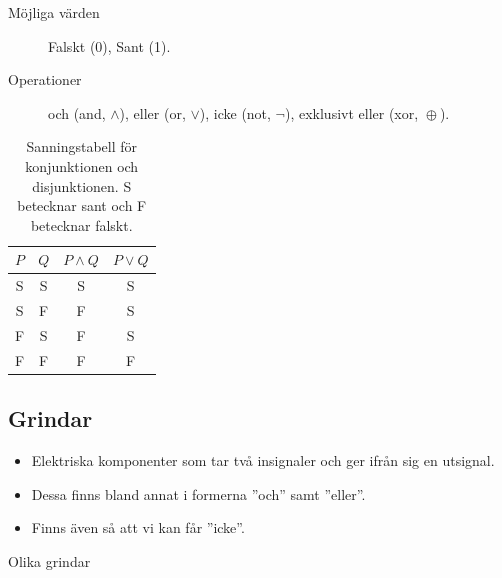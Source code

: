 \documentclass{beamer}
\DeclareMathOperator{\xor}{\oplus}
\theoremstyle{definition}
\theoremstyle{remark}
\begin{document}
\begin{frame}{\insertsubsectionhead}
  \begin{description}
    \item[Möjliga värden] Falskt (0), Sant (1).
    \item[Operationer] och (and, \(\land\)),
      eller (or, \(\lor\)),
      icke (not, \(\lnot\)),
      exklusivt eller (xor, \(\xor\)).
  \end{description}
\end{frame}

\begin{frame}{\insertsubsectionhead}
  \begin{table}
    \caption{Sanningstabell för konjunktionen och disjunktionen. S betecknar 
      sant
      och F betecknar falskt.}
    \begin{tabular}{c|c|c|c}
      \toprule
      \(P\)    & \(Q\)      & \(P\land Q\)  & \(P\lor Q\) \\
      \midrule
      S      &  S      & S       & S \\
      S      &  F      & F        & S \\
      F      &  S      & F        & S \\
      F      &  F      & F        & F \\
      \bottomrule
    \end{tabular}
    \label{tbl:SanningKonjunktionDisjunktion}
  \end{table}
\end{frame}


\subsection{Grindar}

\begin{frame}{\insertsubsectionhead}
  \begin{itemize}
    \item Elektriska komponenter som tar två insignaler och ger ifrån sig en 
      utsignal.
    \item Dessa finns bland annat i formerna ''och'' samt ''eller''.
    \item Finns även så att vi kan får ''icke''.
  \end{itemize}
\end{frame}

\begin{frame}{\insertsubsectionhead}{Olika grindar}
\end{frame}
\end{document}
